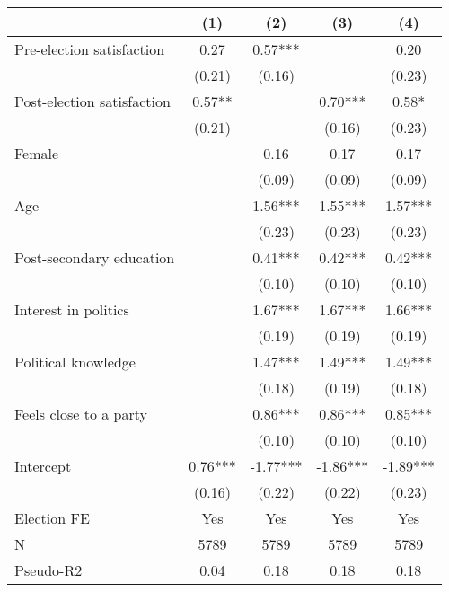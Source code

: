\begin{tabular}[t]{lcccc}
\toprule
  & (1) & (2) & (3) & (4)\\
\midrule
Pre-election satisfaction & 0.27 & 0.57*** &  & 0.20\\
 & (0.21) & (0.16) &  & (0.23)\\
Post-election satisfaction & 0.57** &  & 0.70*** & 0.58*\\
 & (0.21) &  & (0.16) & (0.23)\\
Female &  & 0.16 & 0.17 & 0.17\\
 &  & (0.09) & (0.09) & (0.09)\\
Age &  & 1.56*** & 1.55*** & 1.57***\\
 &  & (0.23) & (0.23) & (0.23)\\
Post-secondary education &  & 0.41*** & 0.42*** & 0.42***\\
 &  & (0.10) & (0.10) & (0.10)\\
Interest in politics &  & 1.67*** & 1.67*** & 1.66***\\
 &  & (0.19) & (0.19) & (0.19)\\
Political knowledge &  & 1.47*** & 1.49*** & 1.49***\\
 &  & (0.18) & (0.19) & (0.18)\\
Feels close to a party &  & 0.86*** & 0.86*** & 0.85***\\
 &  & (0.10) & (0.10) & (0.10)\\
Intercept & 0.76*** & -1.77*** & -1.86*** & -1.89***\\
 & (0.16) & (0.22) & (0.22) & (0.23)\\
Election FE & Yes & Yes & Yes & Yes\\
\midrule
N & 5789 & 5789 & 5789 & 5789\\
Pseudo-R2 & 0.04 & 0.18 & 0.18 & 0.18\\
\bottomrule
\end{tabular}

